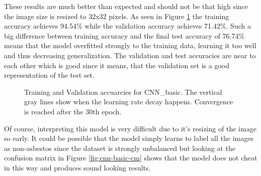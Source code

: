 These results are much better than expected and should not be that high since the image size is resized to 32x32 pixels. As seen in Figure \ref{fig:cnn-basic} the training accuracy achieves 94.54\% while the validation accuracy achieves 71.42\%. Such a big difference between training accuracy and the final test accuracy of 76.74\% means that the model overfitted strongly to the training data, learning it too well and thus decreasing generalization. The validation and test accuracies are near to each other which is good since it means, that the validation set is a good representation of the test set.\\


\begin{figure}[h]
\centering
\caption{Training and Validation accuarcies for CNN\_basic. The vertical gray lines show when the learning rate decay happens. Convergence is reached after the 30th epoch.}
\label{fig:cnn-basic}
\end{figure}

\quad

Of course, interpreting this model is very difficult due to it's resizing of the image so early. It could be possible that the model simply learns to label all the images as non-asbestos since the dataset is strongly unbalanced but looking at the confusion matrix in Figure \ref{fig:cnn-basic-cm} shows that the model does not cheat in this way and produces sound looking results. \\


